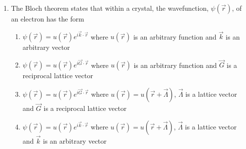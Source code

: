 \documentclass[journal,12pt,onecolumn]{IEEEtran}
\theoremstyle{remark}
\begin{document}
\begin{enumerate}
\item The Bloch theorem states that within a crystal, the wavefunction, $\psi(\vec{r})$, of an electron has the form\hfill{}

\begin{enumerate}
	\item $\psi(\vec{r})=u(\vec{r})e^{i\vec{k}\cdot\vec{r}}$ where $u(\vec{r})$ is an arbitrary function and $\vec{k}$ is an arbitrary vector
	\item $\psi(\vec{r})=u(\vec{r})e^{i\vec{G}\cdot\vec{r}}$ where $u(\vec{r})$ is an arbitrary function and $\vec{G}$ is a reciprocal lattice vector
	\item $\psi(\vec{r})=u(\vec{r})e^{i\vec{G}\cdot\vec{r}}$ where $u(\vec{r})=u(\vec{r}+\vec{\Lambda})$, $\vec{\Lambda}$ is a lattice vector and $\vec{G}$ is a reciprocal lattice vector
	\item $\psi(\vec{r})=u(\vec{r})e^{i\vec{k}\cdot\vec{r}}$ where $u(\vec{r})=u(\vec{r}+\vec{\Lambda})$, $\vec{\Lambda}$ is a lattice vector and $\vec{k}$ is an arbitrary vector
\end{enumerate}


\end{enumerate}
\end{document}
